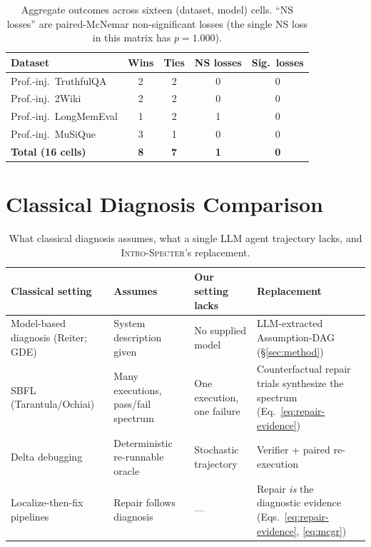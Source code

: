 \documentclass{article}
\newcommand{\method}{\textsc{Intro-Specter}\xspace}
\begin{document}
\begin{table}[t]\centering\small
\caption{Aggregate outcomes across sixteen (dataset, model) cells. ``NS losses'' are paired-McNemar non-significant losses (the single NS loss in this matrix has $p = 1.000$).}
\label{tab:summary-arch}
\begin{tabular}{lcccc}\toprule
\textbf{Dataset} & \textbf{Wins} & \textbf{Ties} & \textbf{NS losses} & \textbf{Sig.\ losses} \\\midrule
Prof.-inj.\ TruthfulQA & 2 & 2 & 0 & 0 \\
Prof.-inj.\ 2Wiki & 2 & 2 & 0 & 0 \\
Prof.-inj.\ LongMemEval & 1 & 2 & 1 & 0 \\
Prof.-inj.\ MuSiQue & 3 & 1 & 0 & 0 \\\midrule
\textbf{Total (16 cells)} & \textbf{8} & \textbf{7} & \textbf{1} & \textbf{0} \\
\bottomrule\end{tabular}\end{table}

\section{Classical Diagnosis Comparison}\label{app:classical-comparison}

\begin{table}[t]\centering\small
\caption{What classical diagnosis assumes, what a single LLM agent trajectory lacks, and \method's replacement.}
\label{tab:classical}
\begin{tabular}{p{3.1cm}p{3.4cm}p{2.9cm}p{3.4cm}}\toprule
Classical setting & Assumes & Our setting lacks & Replacement \\\midrule
Model-based diagnosis (Reiter; GDE) & System description given & No supplied model & LLM-extracted Assumption-DAG (\S\ref{sec:method}) \\
SBFL (Tarantula/Ochiai) & Many executions, pass/fail spectrum & One execution, one failure & Counterfactual repair trials synthesize the spectrum (Eq.~\ref{eq:repair-evidence}) \\
Delta debugging & Deterministic re-runnable oracle & Stochastic trajectory & Verifier + paired re-execution \\
Localize-then-fix pipelines & Repair follows diagnosis & --- & Repair \emph{is} the diagnostic evidence (Eqs.~\ref{eq:repair-evidence}, \ref{eq:mcgr}) \\
\bottomrule\end{tabular}\end{table}
\end{document}
